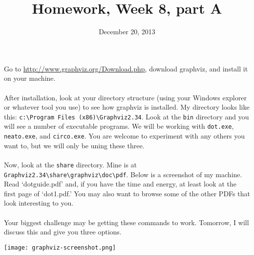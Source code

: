 \documentclass{article}
\title{Homework, Week 8, part A}
\date{December 20, 2013}
\begin{document}
\maketitle{}

\paragraph{}Go to \url{http://www.graphviz.org/Download.php}, download graphviz, and install it on your machine.

\paragraph{}After installation, look at your directory structure (using your Windows explorer or whatever tool you use) to see how graphviz is installed. My directory looks like this: \texttt{c:\textbackslash{}Program Files (x86)\textbackslash{}Graphviz2.34}. Look at the \texttt{bin} directory and you will see a number of executable programs. We will be working with \texttt{dot.exe}, \texttt{neato.exe}, and \texttt{circo.exe}. You are welcome to experiment with any others you want to, but we will only be uning these three.

\paragraph{}Now, look at the \texttt{share} directory. Mine is at \texttt{Graphviz2.34\textbackslash{}share\textbackslash{}graphviz\textbackslash{}doc\textbackslash{}pdf}. Below is a screenshot of my machine. Read `dotguide.pdf' and, if you have the time and energy, at least look at the first page of `dot1.pdf.' You may also want to browse some of the other PDFs that look interesting to you.

\paragraph{}Your biggest challenge may be getting these commands to work. Tomorrow, I will discuss this and give you three options.

\texttt{[image: graphviz-screenshot.png]}
\end{document}
